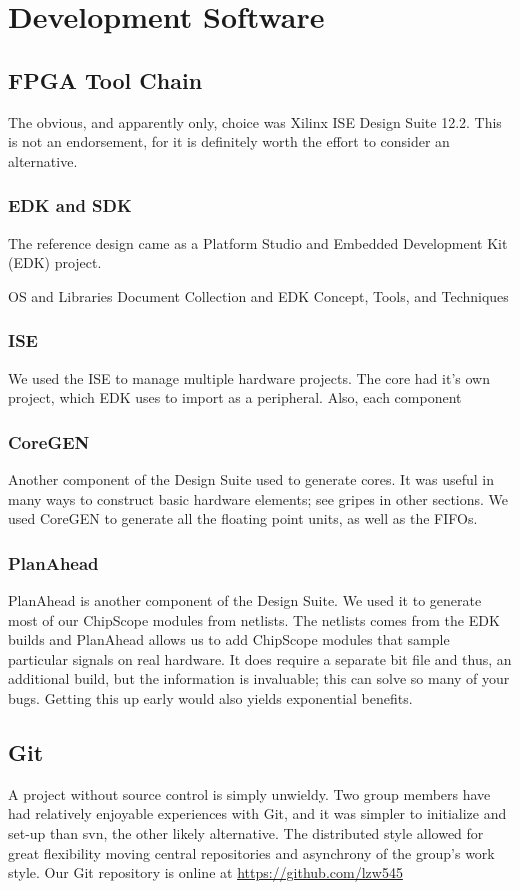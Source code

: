 \documentclass[letterpaper,10pt]{article}
\begin{document}
\section{Development Software}

\subsection{FPGA Tool Chain}
The obvious, and apparently only, choice was Xilinx ISE Design Suite 12.2.  This is not an endorsement, for it is definitely worth the effort to consider an alternative.

\subsubsection{EDK and SDK}
The reference design came as a Platform Studio and Embedded Development Kit (EDK) project.  

OS and Libraries Document Collection and EDK Concept, Tools, and Techniques

\subsubsection{ISE}
We used the ISE to manage multiple hardware projects.  The core had it's own project, which EDK uses to import as a peripheral.  Also, each component 

\subsubsection{CoreGEN}
Another component of the Design Suite used to generate cores.  It was useful in many ways to construct basic hardware elements; see gripes in other sections. We used CoreGEN to generate all the floating point units, as well as the FIFOs.

\subsubsection{PlanAhead}
PlanAhead is another component of the Design Suite.  We used it to generate most of our ChipScope modules from netlists.  The netlists comes from the EDK builds and PlanAhead allows us to add ChipScope modules that sample particular signals on real hardware.  It does require a separate bit file and thus, an additional build, but the information is invaluable; this can solve so many of your bugs.  Getting this up early would also yields exponential benefits.

\subsection{Git}
A project without source control is simply unwieldy.  Two group members have had relatively enjoyable experiences with Git, and it was simpler to initialize and set-up than svn, the other likely alternative.  The distributed style allowed for great flexibility moving central repositories and asynchrony of the group's work style. Our Git repository is online at \url{https://github.com/lzw545}
\end{document}
